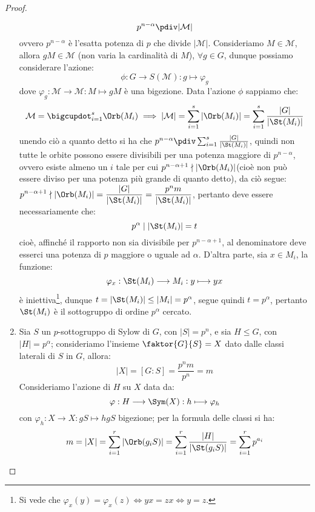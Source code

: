 \documentclass[11pt]{scrartcl}
\begin{document}
\begin{proof}
\begin{enumerate}[(1)]
                \[ p^{n - \alpha} \pdiv |\mathcal{M}|
                    \] 
                ovvero $p^{n - \alpha}$ è l'esatta potenza di $p$ che divide $|\mathcal{M}|$.
                Consideriamo $M \in \mathcal{M}$, allora $gM \in \mathcal{M}$ (non varia la cardinalità di $M$), $\forall g \in G$, dunque possiamo considerare l'azione:
                \[ \phi : G \longrightarrow S(\mathcal{M}) : g \longmapsto \varphi_g
                    \]
                dove $\varphi_g : \mathcal{M} \longrightarrow \mathcal{M} : M \longmapsto gM$ è una bigezione. Data l'azione $\phi$ sappiamo che:
                \[ \mathcal{M} = \bigcupdot_{i = 1}^{s}\Orb(M_i) \implies |\mathcal{M}| = \sum_{i = 1}^{s} |\Orb(M_i)| = \sum_{i = 1}^s \frac{|G|}{|\St(M_i)|}
                    \]
                unendo ciò a quanto detto si ha che $p^{n - \alpha} \pdiv \sum_{i = 1}^s \frac{|G|}{|\St(M_i)|}$, quindi non tutte le orbite possono essere divisibili per una potenza maggiore di $p^{n - \alpha}$, ovvero esiste almeno un $i$
                tale per cui $p^{n - \alpha + 1} \nmid |\Orb(M_i)|$(cioè non può essere diviso per una potenza più grande di quanto detto), da ciò segue: $\displaystyle p^{n - \alpha + 1} \nmid |\Orb(M_i)| = \frac{|G|}{|\St(M_i)|} = \frac{p^nm}{|\St(M_i)|}$,
                pertanto deve essere necessariamente che:
                \[ p^{\alpha} \mid |\St(M_i)| = t
                    \]
                cioè, affinché il rapporto non sia divisibile per $p^{n-\alpha+1}$, al denominatore deve esserci una potenza di $p$ maggiore o uguale ad $\alpha$. D'altra parte, sia $x \in M_i$, la funzione:
                \[ \varphi_x : \St(M_i) \longrightarrow M_i : y \longmapsto yx 
                    \]
                è iniettiva\footnote{Si vede che $\varphi_x(y) = \varphi_x(z) \iff yx = zx \iff y = z$.}, dunque $t = |\St(M_i)| \leq |M_i| = p^{\alpha}$, segue quindi $t = p^{\alpha}$, pertanto $\St(M_i)$ è il sottogruppo di ordine $p^{\alpha}$ cercato.
            \item Sia $S$ un $p$-sottogruppo di Sylow di $G$, con $|S| = p^n$, e sia $H \leqslant G$, con $|H| = p^{\alpha}$; consideriamo l'insieme $\faktor{G}{S} = X$ dato dalle classi laterali di $S$ in $G$, allora:
                \[ |X| = [G : S] = \frac{p^nm}{p^n} = m
                    \]
                Consideriamo l'azione di $H$ su $X$ data da:
                \[ \varphi: H \longrightarrow \Sym(X) : h \longmapsto \varphi_h
                    \]
                con $\varphi_h : X \longrightarrow X : gS \longmapsto hgS$ bigezione; per la formula delle classi si ha:
                \[ m = |X| = \sum_{i = 1}^{r}|\Orb(g_iS)| = \sum_{i = 1}^{r} \frac{|H|}{|\St(g_iS)|} = \sum_{i = 1}^{r} p^{a_i}
\]
\end{enumerate}
\end{proof}
\end{document}
